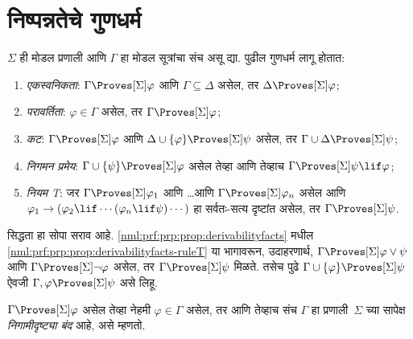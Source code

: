 \section{निष्पन्नतेचे गुणधर्म}\label{nml:prf:prp:sec}

\begin{prop}\label{nml:prf:prp:prop:derivabilityfacts}
  $\Sigma$ ही मोडल प्रणाली आणि $\Gamma$ हा मोडल
  सूत्रांचा संच असू द्या. पुढील गुणधर्म लागू होतात:
  \begin{enumerate}
  \item\label{nml:prf:prp:prop:derivabilityfacts-monotonicity} \emph{एकस्वनिकता}:
    $\Gamma \Proves[\Sigma] \varphi$ आणि
    $\Gamma \subseteq \Delta$ असेल, तर
    $\Delta \Proves[\Sigma] \varphi$;
  \item\label{nml:prf:prp:prop:derivabilityfacts-reflexivity}
    \emph{परावर्तिता}: $\varphi \in \Gamma$ असेल, तर $\Gamma
    \Proves[\Sigma] \varphi$;
  \item\label{nml:prf:prp:prop:derivabilityfacts-cut} \emph{कट}: $\Gamma
    \Proves[\Sigma] \varphi$ आणि $\Delta \cup \{\varphi\} \Proves[\Sigma] \psi$
    असेल, तर $\Gamma \cup \Delta \Proves[\Sigma] \psi$;
  \item\label{nml:prf:prp:prop:derivabilityfacts-deduction} \emph{निगमन प्रमेय}: $\Gamma \cup \{\psi\}
    \Proves[\Sigma] \varphi$ असेल तेव्हा आणि तेव्हाच $\Gamma \Proves[\Sigma] \psi \lif
      \varphi$;
  \item \label{nml:prf:prp:prop:derivabilityfacts-ruleT} \emph{नियम T}: जर
    $\Gamma \Proves[\Sigma] \varphi_1$ आणि \dots आणि $\Gamma
    \Proves[\Sigma] \varphi_n$ असेल आणि $\varphi_1 \to (\varphi_2 \lif \cdots (\varphi_n \lif
    \psi)\cdots)$ हा सर्वतः-सत्य दृष्टांत असेल, तर $\Gamma
    \Proves[\Sigma] \psi$.
  \end{enumerate}
\end{prop}

सिद्धता हा सोपा सराव आहे.
\ref{nml:prf:prp:prop:derivabilityfacts} मधील
\ref{nml:prf:prp:prop:derivabilityfacts-ruleT} या भागावरून,
उदाहरणार्थ, $\Gamma \Proves[\Sigma] \varphi \lor \psi$
आणि $\Gamma \Proves[\Sigma] \lnot \varphi$ असेल, तर
$\Gamma \Proves[\Sigma] \psi$ मिळते.
तसेच पुढे $\Gamma \cup \{ \varphi\} \Proves[\Sigma] \psi$
ऐवजी $\Gamma, \varphi \Proves[\Sigma] \psi$ असे लिहू.

\begin{defn}
  $\Gamma \Proves[\Sigma] \varphi$ असेल तेव्हा नेहमी
  $\varphi \in \Gamma$ असेल, तर आणि तेव्हाच संच
  $\Gamma$ हा प्रणाली~$\Sigma$ च्या सापेक्ष
  \emph{निगामीदृष्ट्या बंद} आहे, असे म्हणतो.
\end{defn}













